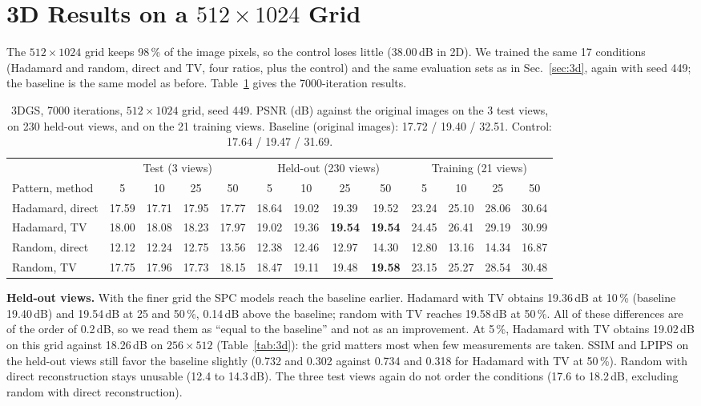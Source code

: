 \documentclass[conference]{IEEEtran}
\begin{document}
\section{3D Results on a $512\times1024$ Grid}
\label{sec:3d512}
The $512\times1024$ grid keeps 98\,\% of the image pixels, so the control loses little (38.00\,dB in 2D). We trained the same
17 conditions (Hadamard and random, direct and TV, four ratios, plus the control) and the same evaluation sets as in
Sec.~\ref{sec:3d}, again with seed 449; the baseline is the same model as before. Table~\ref{tab:3d512} gives the 7000-iteration results.

\begin{table}[t]
\caption{3DGS, 7000 iterations, $512\times1024$ grid, seed 449. PSNR (dB) against the original images on the 3 test views, on
230 held-out views, and on the 21 training views. Baseline (original images): 17.72 / 19.40 / 32.51. Control: 17.64 / 19.47 / 31.69.}
\label{tab:3d512}
\centering
\footnotesize
\setlength{\tabcolsep}{3.5pt}
\begin{tabular}{lcccc|cccc|cccc}
\toprule
 & \multicolumn{4}{c|}{Test (3 views)} & \multicolumn{4}{c|}{Held-out (230 views)} & \multicolumn{4}{c}{Training (21 views)}\\
Pattern, method & 5 & 10 & 25 & 50 & 5 & 10 & 25 & 50 & 5 & 10 & 25 & 50 \\
\midrule
Hadamard, direct & 17.59 & 17.71 & 17.95 & 17.77 & 18.64 & 19.02 & 19.39 & 19.52 & 23.24 & 25.10 & 28.06 & 30.64 \\
Hadamard, TV & 18.00 & 18.08 & 18.23 & 17.97 & 19.02 & 19.36 & \textbf{19.54} & \textbf{19.54} & 24.45 & 26.41 & 29.19 & 30.99 \\
Random, direct & 12.12 & 12.24 & 12.75 & 13.56 & 12.38 & 12.46 & 12.97 & 14.30 & 12.80 & 13.16 & 14.34 & 16.87 \\
Random, TV & 17.75 & 17.96 & 17.73 & 18.15 & 18.47 & 19.11 & 19.48 & \textbf{19.58} & 23.15 & 25.27 & 28.54 & 30.48 \\
\bottomrule
\end{tabular}
\end{table}

\textbf{Held-out views.} With the finer grid the SPC models reach the baseline earlier. Hadamard with TV obtains 19.36\,dB at
10\,\% (baseline 19.40\,dB) and 19.54\,dB at 25 and 50\,\%, 0.14\,dB above the baseline; random with TV reaches 19.58\,dB at 50\,\%.
All of these differences are of the order of 0.2\,dB, so we read them as ``equal to the baseline'' and not as an improvement. At 5\,\%,
Hadamard with TV obtains 19.02\,dB on this grid against 18.26\,dB on $256\times512$ (Table~\ref{tab:3d}): the grid matters most
when few measurements are taken. SSIM and LPIPS on the held-out views still favor the baseline slightly (0.732 and 0.302 against
0.734 and 0.318 for Hadamard with TV at 50\,\%). Random with direct reconstruction stays unusable (12.4 to 14.3\,dB). The three test
views again do not order the conditions (17.6 to 18.2\,dB, excluding random with direct reconstruction).
\end{document}
